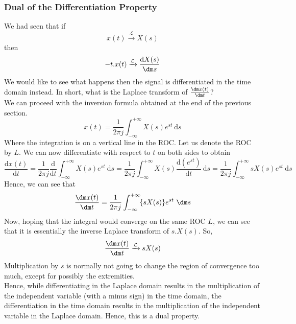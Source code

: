 \subsubsection{Dual of the Differentiation Property}
We had seen that if
\[
x(t) \xrightarrow{\mathcal{L}} X(s)
\]
then
\[
-t.x(t) \xrightarrow{\mathcal{L}} \frac{\mathrm{d}X(s)}{\dm s}
\]
We would like to see what happens then the signal is differentiated in the time domain instead. In short, what is the Laplace transform of $\frac{\dm x(t)}{\dm t}$?\\
We can proceed with the inversion formula obtained at the end of the previous section.
\[
x(t) = \frac{1}{2\pi j}\int_{-\infty}^{+\infty} \! X(s)e^{s t} \ \mathrm{d}s
\]
Where the integration is on a vertical line in the ROC. Let us denote the ROC by $L$.
We can now differentiate with respect to $t$ on both sides to obtain
\[
\frac{\mathrm{d}x(t)}{\mathrm{d}t} = \frac{1}{2\pi j}\frac{\mathrm{d}}{\mathrm{d}t}\int_{-\infty}^{+\infty} \! X(s)e^{s t} \ \mathrm{d}s = \frac{1}{2\pi j}\int_{-\infty}^{+\infty} \! X(s)\frac{\mathrm{d}(e^{s t})}{\mathrm{d}t} \ \mathrm{d}s = \frac{1}{2\pi j}\int_{-\infty}^{+\infty} \! s X(s)e^{s t} \ \mathrm{d}s
\]
Hence, we can see that
\[
\frac{\dm x(t)}{\dm t} = \frac{1}{2\pi j}\int_{-\infty}^{+\infty} \! \{ s X(s) \} e^{s t} \ \dm s
\]
Now, hoping that the integral would converge on the same ROC $L$, we can see that it is essentially the inverse Laplace transform of $s.X(s)$. So,
\[
\frac{\dm x(t)}{\dm t} \xrightarrow{\mathcal{L}} sX(s)
\]
Multiplication by $s$ is normally not going to change the region of convergence too much, except for possibly the extremities.\\
Hence, while differentiating in the Laplace domain results in the multiplication of the independent variable (with a minus sign) in the time domain, the differentiation in the time domain results in the multiplication of the independent variable in the Laplace domain. Hence, this is a dual property.
